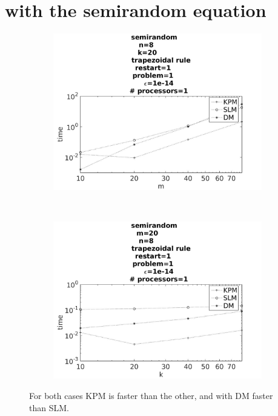 \section{with the semirandom equation}



\begin{figure}[H]
        \centering
        \begin{subfigure}[b]{0.45\textwidth}
                \includegraphics[width=\textwidth]{../MATLAB/fig/sresulttimem.jpg}
                \caption{  }
                \label{fig:sresulttimem}
        \end{subfigure}
        ~
        \begin{subfigure}[b]{0.45\textwidth}
                \includegraphics[width=\textwidth]{../MATLAB/fig/sresulttimek.jpg}
                \caption{  }
                \label{fig:sresulttimek}
        \end{subfigure}
        \caption{ For both cases KPM is faster than the other, and with DM faster than SLM.  }
        \label{fig:sresulttime}
\end{figure}



